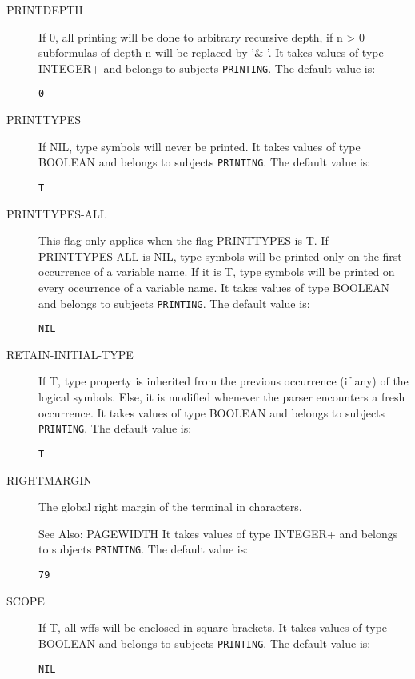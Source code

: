 \begin{description}
\item[PRINTDEPTH]  
If 0, all printing will be done to arbitrary recursive depth,
if n > 0 subformulas of depth n will be replaced by '\& '.
It takes values of type INTEGER+ and belongs to subjects \texttt{PRINTING}.  The default value is: \begin{lstlisting}
0
\end{lstlisting}

\item[PRINTTYPES]  
If NIL, type symbols will never be printed.
It takes values of type BOOLEAN and belongs to subjects \texttt{PRINTING}.  The default value is: \begin{lstlisting}
T
\end{lstlisting}

\item[PRINTTYPES-ALL]  
This flag only applies when the flag PRINTTYPES is T.
If PRINTTYPES-ALL is NIL, type symbols will be printed only on the first 
occurrence of a variable name. If it is T, type symbols will be printed on
every occurrence of a variable name.
It takes values of type BOOLEAN and belongs to subjects \texttt{PRINTING}.  The default value is: \begin{lstlisting}
NIL
\end{lstlisting}

\item[RETAIN-INITIAL-TYPE]  
If T, type property is inherited from the previous occurrence (if any)
of the logical symbols. Else, it is modified whenever the parser encounters
a fresh occurrence.
It takes values of type BOOLEAN and belongs to subjects \texttt{PRINTING}.  The default value is: \begin{lstlisting}
T
\end{lstlisting}

\item[RIGHTMARGIN]  
The global right margin of the terminal in characters.

See Also:  PAGEWIDTH
It takes values of type INTEGER+ and belongs to subjects \texttt{PRINTING}.  The default value is: \begin{lstlisting}
79
\end{lstlisting}

\item[SCOPE]  
If T, all wffs will be enclosed in square brackets.
It takes values of type BOOLEAN and belongs to subjects \texttt{PRINTING}.  The default value is: \begin{lstlisting}
NIL
\end{lstlisting}


\end{description}
